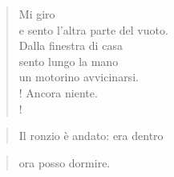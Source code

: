 \begin{verse}
Mi giro\\
e sento l'altra parte del vuoto.\\
Dalla finestra di casa\\
sento lungo la mano\\
un motorino avvicinarsi.\\!
Ancora niente.\\!
\end{verse}
\vspace{0.5cm}
\begin{verse}
Il ronzio è andato: \hfill era dentro
\end{verse}
\vspace{-0.9cm}
\begin{verse}
ora posso dormire.
\end{verse}